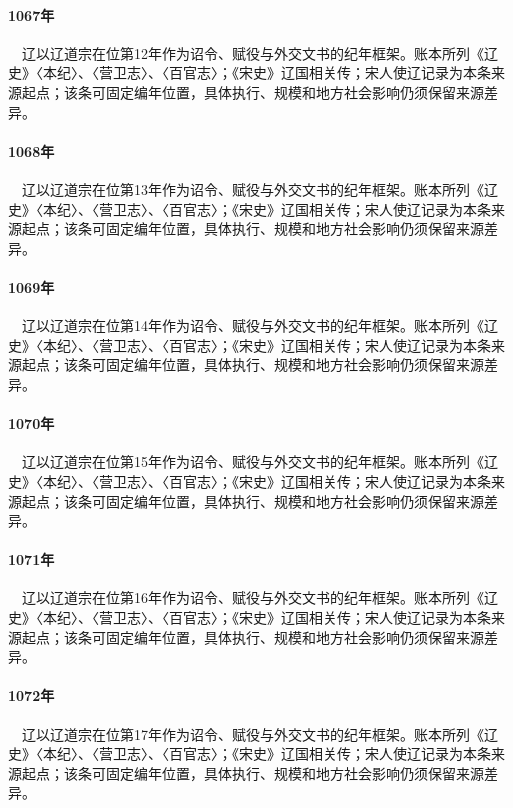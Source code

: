 \paragraph{1067年}　辽以辽道宗在位第12年作为诏令、赋役与外交文书的纪年框架。账本所列《辽史》〈本纪〉、〈营卫志〉、〈百官志〉；《宋史》辽国相关传；宋人使辽记录为本条来源起点；该条可固定编年位置，具体执行、规模和地方社会影响仍须保留来源差异。

\paragraph{1068年}　辽以辽道宗在位第13年作为诏令、赋役与外交文书的纪年框架。账本所列《辽史》〈本纪〉、〈营卫志〉、〈百官志〉；《宋史》辽国相关传；宋人使辽记录为本条来源起点；该条可固定编年位置，具体执行、规模和地方社会影响仍须保留来源差异。

\paragraph{1069年}　辽以辽道宗在位第14年作为诏令、赋役与外交文书的纪年框架。账本所列《辽史》〈本纪〉、〈营卫志〉、〈百官志〉；《宋史》辽国相关传；宋人使辽记录为本条来源起点；该条可固定编年位置，具体执行、规模和地方社会影响仍须保留来源差异。

\paragraph{1070年}　辽以辽道宗在位第15年作为诏令、赋役与外交文书的纪年框架。账本所列《辽史》〈本纪〉、〈营卫志〉、〈百官志〉；《宋史》辽国相关传；宋人使辽记录为本条来源起点；该条可固定编年位置，具体执行、规模和地方社会影响仍须保留来源差异。

\paragraph{1071年}　辽以辽道宗在位第16年作为诏令、赋役与外交文书的纪年框架。账本所列《辽史》〈本纪〉、〈营卫志〉、〈百官志〉；《宋史》辽国相关传；宋人使辽记录为本条来源起点；该条可固定编年位置，具体执行、规模和地方社会影响仍须保留来源差异。

\paragraph{1072年}　辽以辽道宗在位第17年作为诏令、赋役与外交文书的纪年框架。账本所列《辽史》〈本纪〉、〈营卫志〉、〈百官志〉；《宋史》辽国相关传；宋人使辽记录为本条来源起点；该条可固定编年位置，具体执行、规模和地方社会影响仍须保留来源差异。

